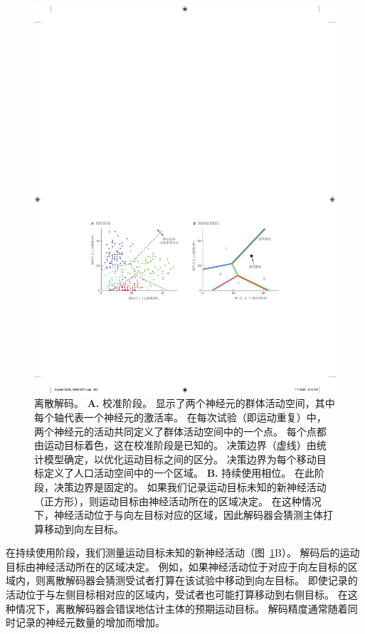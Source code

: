 \begin{figure}[htbp]
	\centering
	\includegraphics[width=0.9\linewidth]{chap39/fig_39_5}
	\caption{离散解码。
		\textbf{A.} 校准阶段。
		显示了两个神经元的群体活动空间，其中每个轴代表一个神经元的激活率。
		在每次试验（即运动重复）中，两个神经元的活动共同定义了群体活动空间中的一个点。
		每个点都由运动目标着色，这在校准阶段是已知的。 
		决策边界（虚线）由统计模型确定，以优化运动目标之间的区分。
		决策边界为每个移动目标定义了人口活动空间中的一个区域。
		\textbf{B.} 持续使用相位。
		在此阶段，决策边界是固定的。
		如果我们记录运动目标未知的新神经活动（正方形），则运动目标由神经活动所在的区域决定。
		在这种情况下，神经活动位于与向左目标对应的区域，因此解码器会猜测主体打算移动到向左目标。}
	\label{fig:39_5}
\end{figure}



在持续使用阶段，我们测量运动目标未知的新神经活动（图~\ref{fig:39_5}B）。
解码后的运动目标由神经活动所在的区域决定。
例如，如果神经活动位于对应于向左目标的区域内，则离散解码器会猜测受试者打算在该试验中移动到向左目标。 
即使记录的活动位于与左侧目标相对应的区域内，受试者也可能打算移动到右侧目标。
在这种情况下，离散解码器会错误地估计主体的预期运动目标。
解码精度通常随着同时记录的神经元数量的增加而增加。



